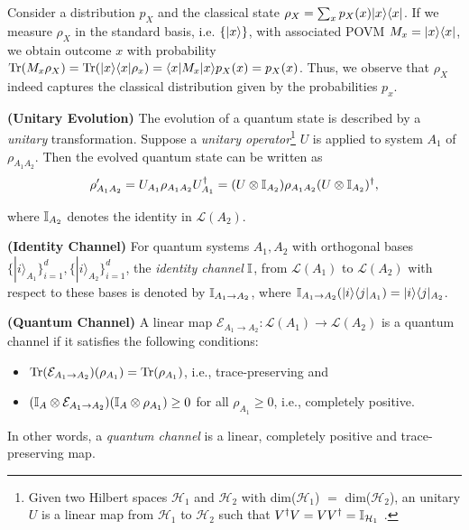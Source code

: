 \begin{example}
    Consider a distribution $p_X$ and the classical state $\rho_X = \sum_{x} p_X(x) |x \rangle\langle x|$. If we
measure $\rho_X$ in the standard basis, i.e. $\{|x \rangle\}$, with associated POVM $M_x = |x \rangle\langle x|$, we
obtain outcome $x$ with probability
$\operatorname{Tr}(M_x\rho_X) = \operatorname{Tr}(|x \rangle\langle x| \rho_x) = \langle x|M_x|x \rangle p_X(x) = p_{X}(x)$.
Thus, we observe that $\rho_X$ indeed captures the classical distribution given by the probabilities $p_x$. 
\end{example}
\begin{definition}\textbf{(Unitary Evolution)} The evolution of a quantum state is described by a \textit{unitary} transformation. Suppose a  \emph{unitary operator}\footnote{Given two Hilbert spaces $\mathcal{H}_1$ and $\mathcal{H}_2$ with dim($\mathcal{H}_1$) $=$ dim($\mathcal{H}_2$), an unitary $U$ is a linear map from $\mathcal{H}_1$ to $\mathcal{H}_2$ such that $V^\dag V = V V^\dag = \mathbb{I}_{\mathcal{H}_1}$ \cite{wilde2013quantum,nielsen2002quantum}.} $U$ is applied to system $A_1$ of $\rho_{A_1A_2}$. Then the evolved quantum state can be written as
$$\rho'_{A_1A_2} = U_{A_1}\rho_{A_1A_2}U^{\dag}_{A_1} = (U \otimes \mathbb{I}_{A_2})\rho_{A_1A_2}(U \otimes \mathbb{I}_{A_2})^{\dag},$$
\end{definition}
where $\mathbb{I}_{A_2}$ denotes the identity in $\mathcal{L}(A_2)$.
\begin{definition}\textbf{(Identity Channel)}
For quantum systems $A_1, A_2$ with orthogonal bases 
$\{|i \rangle_{A_1}\}^{d}_{i=1}, \{|i \rangle_{A_2}\}^{d}_{i=1}$,
the \emph{identity channel} $\mathbb{I}$, from $\mathcal{L}(A_1)$ to $\mathcal{L}(A_2)$ with respect to these bases is denoted by $\mathbb{I}_{A_1 \rightarrow A_2}$, where $\mathbb{I}_{A_1 \rightarrow A_2}(|i\rangle \langle j|_{A_1}) = |i\rangle \langle j|_{A_2}$.
\end{definition}
\begin{definition}\textbf{(Quantum Channel)}
A linear map $\mathcal{E}_{A_1 \rightarrow A_2}: \mathcal{L}(A_1) \rightarrow \mathcal{L}(A_2)$ is a quantum channel if it satisfies the following conditions: 
\begin{itemize}
    \item $ \operatorname{Tr}(\mathcal{E}_{A_1 \rightarrow A_2})(\rho_{A_1}) = \operatorname{Tr}(\rho_{A_1})$, i.e., trace-preserving and
    \vspace{-2pt}
    \item $ (\mathbb{I}_A \otimes \mathcal{E}_{A_1 \rightarrow A_2})(\mathbb{I}_A \otimes \rho_{A_1}) \geq 0$ for all $\rho_{A_1} \geq 0$, i.e., completely positive.
\end{itemize} In other words, a \emph{quantum channel} is a linear, completely positive and trace-preserving map.
\end{definition}


